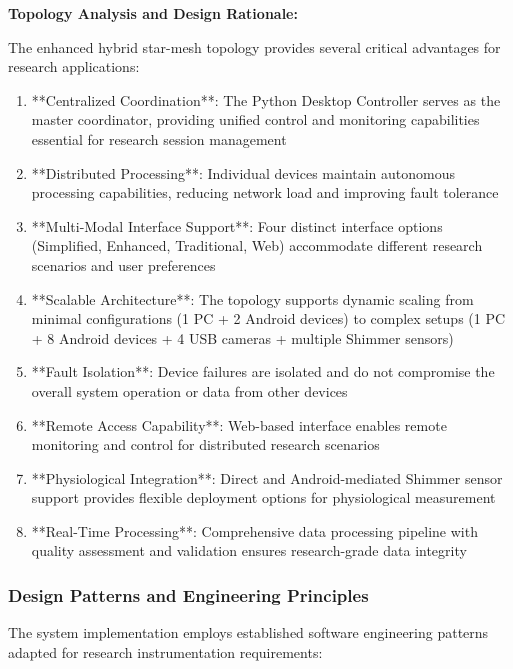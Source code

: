 \documentclass[11pt,a4paper]{article}
\begin{document}
\textbf{Topology Analysis and Design Rationale:}

The enhanced hybrid star-mesh topology provides several critical advantages for research applications:

\begin{enumerate}
\item **Centralized Coordination**: The Python Desktop Controller serves as the master coordinator, providing unified
   control and monitoring capabilities essential for research session management

\item **Distributed Processing**: Individual devices maintain autonomous processing capabilities, reducing network load and
   improving fault tolerance

\item **Multi-Modal Interface Support**: Four distinct interface options (Simplified, Enhanced, Traditional, Web)
   accommodate different research scenarios and user preferences

\item **Scalable Architecture**: The topology supports dynamic scaling from minimal configurations (1 PC + 2 Android
   devices) to complex setups (1 PC + 8 Android devices + 4 USB cameras + multiple Shimmer sensors)

\item **Fault Isolation**: Device failures are isolated and do not compromise the overall system operation or data from
   other devices

\item **Remote Access Capability**: Web-based interface enables remote monitoring and control for distributed research
   scenarios

\item **Physiological Integration**: Direct and Android-mediated Shimmer sensor support provides flexible deployment
   options for physiological measurement

\item **Real-Time Processing**: Comprehensive data processing pipeline with quality assessment and validation ensures
   research-grade data integrity

\end{enumerate}
\subsubsection{Design Patterns and Engineering Principles}

The system implementation employs established software engineering patterns adapted for research instrumentation
requirements:
\end{document}
